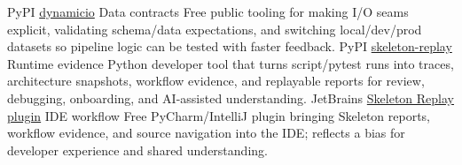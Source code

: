 \documentclass[]{../../friggeri-cv}
\begin{document}
\begin{entrylist2}
    \entrytwo
        {\small PyPI}
        {\small \href{https://pypi.org/project/dynamicio/}{dynamicio}}
        {\small Data contracts}
        {\footnotesize Free public tooling for making I/O seams explicit, validating schema/data expectations, and switching local/dev/prod datasets so pipeline logic can be tested with faster feedback.}
    \entrytwo
        {\small PyPI}
        {\small \href{https://pypi.org/project/skeleton-replay/}{skeleton-replay}}
        {\small Runtime evidence}
        {\footnotesize Python developer tool that turns script/pytest runs into traces, architecture snapshots, workflow evidence, and replayable reports for review, debugging, onboarding, and AI-assisted understanding.}
    \entrytwo
        {\small JetBrains}
        {\small \href{https://plugins.jetbrains.com/plugin/32807-skeleton-replay}{Skeleton Replay plugin}}
        {\small IDE workflow}
        {\footnotesize Free PyCharm/IntelliJ plugin bringing Skeleton reports, workflow evidence, and source navigation into the IDE; reflects a bias for developer experience and shared understanding.}
\end{entrylist2}
\end{document}
